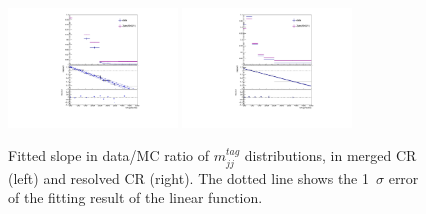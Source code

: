 \begin{figure}[ht]
    \centering
    \includegraphics[width=0.40\textwidth]{figures/2lep/reweighting/MTagMerJets_0ptag1pfat0pjet_0ptv_CRVjet_finerbin}
    \includegraphics[width=0.40\textwidth]{figures/2lep/reweighting/MTagResJets_0ptag2pjet_0ptv_CRVjet_Fid_finerbin}
    \caption{ Fitted slope in data/MC ratio of $m^{tag}_{jj}$ distributions, in merged CR (left) and resolved CR (right). The dotted line shows the 1~$\sigma$ error of the fitting result of the linear function. }
    \label{fig:LinearFit}
\end{figure}


